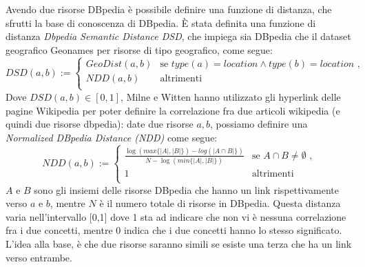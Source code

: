\documentclass[a4paper,12pt]{report}
\begin{document}
Avendo due risorse DBpedia è possibile definire una funzione di distanza, che sfrutti la base di conoscenza di DBpedia. \`E stata definita  una funzione di distanza \emph{Dbpedia Semantic Distance DSD}, che impiega sia DBpedia che il dataset geografico Geonames per risorse di tipo geografico, come segue:
\begin{equation} \label{eq:dbpedia_semantic_distance}
DSD(a,b):=\begin{cases}
GeoDist(a,b) & \text{se $type(a)=location \land type(b)=location$  ,}\\
NDD(a,b) & \text{altrimenti}\\
\end{cases}
\end{equation}
Dove $DSD(a,b) \in [0,1]$,
Milne e Witten \cite{Milne08aneffective} hanno utilizzato gli hyperlink delle pagine Wikipedia per poter definire la correlazione fra due articoli wikipedia (e quindi due risorse dbpedia): date due risorse $a,b$, possiamo definire una \emph{Normalized DBpedia Distance (NDD)} come segue:
\begin{equation} \label{eq:normalized_dbpedia_distance}
NDD(a,b):=\begin{cases}
\frac{\log(max\{|A|,|B|\})-log( |A \cap B|\})}{N-\log(min\{|A|,|B|\})} & \text{se $A \cap B \neq \emptyset $  ,}\\
1 & \text{altrimenti}\\
\end{cases}
\end{equation}
 $A$ e $B$  sono gli insiemi delle risorse DBpedia che hanno un link rispettivamente verso $a$ e $b$, mentre $N$ è il numero totale di risorse in DBpedia. Questa distanza varia nell'intervallo [0,1] dove 1 sta ad indicare che non vi è nessuna correlazione fra i due concetti, mentre 0 indica che i due concetti hanno lo stesso significato. L'idea alla base, è che due risorse saranno simili se esiste una terza che ha un link verso entrambe.
 
\end{document}
